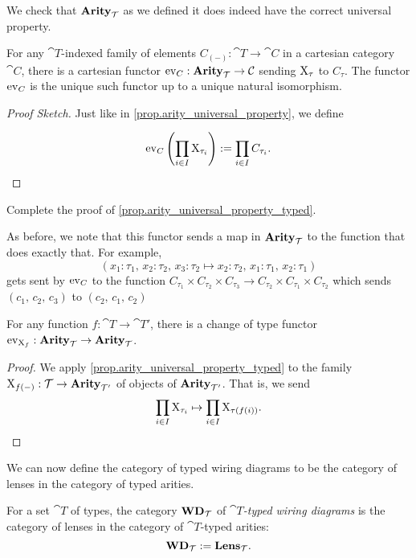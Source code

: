 \documentclass[DynamicalBook]{subfiles}
\begin{document}
We check that $\textbf{Arity}_{\mathcal{T}}$ as we defined it does indeed have the correct
universal property.
\begin{proposition}\label{prop.arity_universal_property_typed}
  For any $\cat{T}$-indexed family of elements $C_{(-)} : \cat{T} \to \cat{C}$
  in a cartesian category $\cat{C}$, there is a cartesian functor $\mathrm{ev}_C :
  \textbf{Arity}_{\mathcal{T}} \to \mathcal{C}$ sending $\mathrm{X}_{\tau}$ to $C_{\tau}$. The functor
  $\mathrm{ev}_C$ is the unique such functor up to a unique natural isomorphism.
\end{proposition}
\begin{proof}[Proof Sketch]
  Just like in \cref{prop.arity_universal_property}, we define

  $$\mathrm{ev}_C\left( \prod_{i \in I} \mathrm{X}_{\tau_i} \right) :=
  \prod_{i \in I} C_{\tau_i}.\qedhere$$
\end{proof}
\begin{exercise}
  Complete the proof of \cref{prop.arity_universal_property_typed}.
\end{exercise}

As before, we note that this functor sends a map in $\textbf{Arity}_{\mathcal{T}}$ to the function that does exactly that. For example,
$$(x_1 : \tau_1,\, x_2 : \tau_2,\, x_3 : \tau_2 \mapsto x_2 : \tau_2,\, x_1 :
\tau_1,\, x_2 : \tau_1)$$
gets sent by $\mathrm{ev}_C$ to the function $C_{\tau_1} \times C_{\tau_2} \times C_{\tau_3} \to
C_{\tau_2} \times C_{\tau_1} \times C_{\tau_2}$ which sends $(c_1,\, c_2,\, c_3)$ to
$(c_2,\, c_1,\, c_2)$

\begin{corollary}\label{cor.arity_change_of_types}
  For any function $f : \cat{T} \to \cat{T'}$, there is a change of type functor
  $\mathrm{ev}_{\mathrm{X}_f} : \textbf{Arity}_{\mathcal{T}} \to \textbf{Arity}_{\mathcal{T}}$.
\end{corollary}
\begin{proof}
  We apply \cref{prop.arity_universal_property_typed} to the family $\mathrm{X}_{f(-)}
  : \mathcal{T} \to \textbf{Arity}_{\mathcal{T'}}$ of objects of $\textbf{Arity}_{\mathcal{T'}}$. That is,
  we send
  $$\prod_{i \in I} \mathrm{X}_{\tau_i} \mapsto \prod_{i \in I} \mathrm{X}_{\tau({f(i))}}.\qedhere$$
\end{proof}

We can now define the category of typed wiring diagrams to be the category of
lenses in the category of typed arities.
\begin{definition}
  For a set $\cat{T}$ of types, the category $\textbf{WD}_{\mathcal{T}}$ of \emph{$\cat{T}$-typed wiring diagrams}
  is the category of lenses in the category of $\cat{T}$-typed arities:
  $$\textbf{WD}_{\mathcal{T}} := \textbf{Lens}_{\mathcal{T}}.$$
\end{definition}
\end{document}
